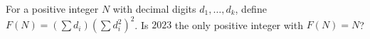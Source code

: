 For a positive integer $N$ with decimal digits $d_1,\ldots,d_k$, define $F(N)=(\sum d_i)(\sum d_i^2)^2$. Is $2023$ the only positive integer with $F(N)=N$?
